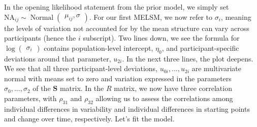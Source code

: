 \documentclass[]{article}
\begin{document}
In the opening likelihood statement from the prior model, we simply set
\(\text{NA}_{ij} \sim \operatorname{Normal}\begin{pmatrix} \mu_{ij}, \sigma \end{pmatrix}\).
For our first MELSM, we now refer to \(\sigma_i\), meaning the levels of
variation not accounted for by the mean structure can vary across
participants (hence the \(i\) subscript). Two lines down, we see the
formula for \(\log \begin{pmatrix} \sigma_i \end{pmatrix}\) contains
population-level intercept, \(\eta_0\), and participant-specific
deviations around that parameter, \(u_{2i}\). In the next three lines,
the plot deepens. We see that all three participant-level deviations,
\(u_{0i},...,u_{2i}\) are multivariate normal with means set to zero and
variation expressed in the parameters \(\sigma_0,...,\sigma_2\) of the
\(\mathbf S\) matrix. In the \(R\) matrix, we now have three correlation
parameters, with \(\rho_{31}\) and \(\rho_{32}\) allowing us to assess
the correlations among individual differences in variability and
individual differences in starting points and change over time,
respectively. Let's fit the model.
\end{document}
